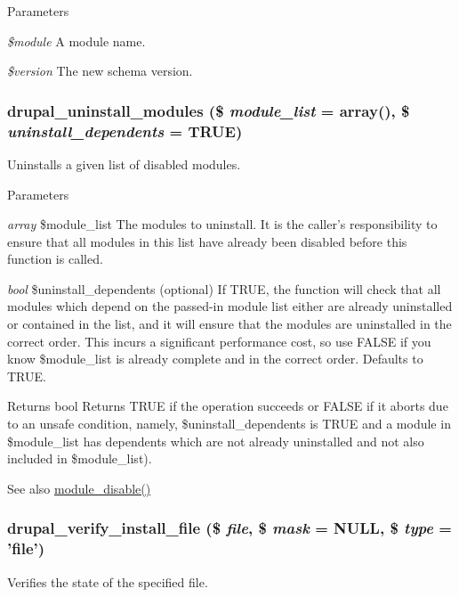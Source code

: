 \begin{DoxyParams}{Parameters}
\item[{\em \$module}]A module name. \item[{\em \$version}]The new schema version. \end{DoxyParams}
\hypertarget{install_8inc_a70bce70ff13aafba3367e81737b85b62}{
\subsubsection[{drupal\_\-uninstall\_\-modules}]{\setlength{\rightskip}{0pt plus 5cm}drupal\_\-uninstall\_\-modules (\$ {\em module\_\-list} = {\ttfamily array()}, \/  \$ {\em uninstall\_\-dependents} = {\ttfamily TRUE})}}
\label{install_8inc_a70bce70ff13aafba3367e81737b85b62}
Uninstalls a given list of disabled modules.


\begin{DoxyParams}{Parameters}
\item[{\em array}]\$module\_\-list The modules to uninstall. It is the caller's responsibility to ensure that all modules in this list have already been disabled before this function is called. \item[{\em bool}]\$uninstall\_\-dependents (optional) If TRUE, the function will check that all modules which depend on the passed-\/in module list either are already uninstalled or contained in the list, and it will ensure that the modules are uninstalled in the correct order. This incurs a significant performance cost, so use FALSE if you know \$module\_\-list is already complete and in the correct order. Defaults to TRUE.\end{DoxyParams}
\begin{DoxyReturn}{Returns}
bool Returns TRUE if the operation succeeds or FALSE if it aborts due to an unsafe condition, namely, \$uninstall\_\-dependents is TRUE and a module in \$module\_\-list has dependents which are not already uninstalled and not also included in \$module\_\-list).
\end{DoxyReturn}
\begin{DoxySeeAlso}{See also}
\hyperlink{module_8inc_a0378d5f56db255c18ca59fc54cd52a94}{module\_\-disable()} 
\end{DoxySeeAlso}
\hypertarget{install_8inc_a604165f37803cd10ac32534e3f8796ed}{
\subsubsection[{drupal\_\-verify\_\-install\_\-file}]{\setlength{\rightskip}{0pt plus 5cm}drupal\_\-verify\_\-install\_\-file (\$ {\em file}, \/  \$ {\em mask} = {\ttfamily NULL}, \/  \$ {\em type} = {\ttfamily 'file'})}}
\label{install_8inc_a604165f37803cd10ac32534e3f8796ed}
Verifies the state of the specified file.


